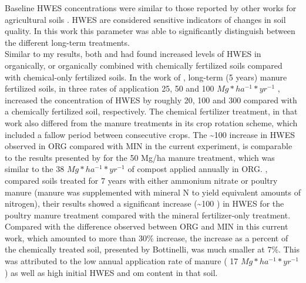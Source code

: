 	Baseline HWES concentrations were similar to those reported by other works for agricultural soils \citep{haynes2005, yousefi2008, puget1998}. HWES are considered sensitive indicators of changes in soil quality. In this work this parameter was able to significantly distinguish between the different long-term treatments.\\
	Similar to my results, both \citet{yousefi2008} and \citet{bottinelli2017} had found increased levels of HWES in organically, or organically combined with chemically fertilized soils compared with chemical-only fertilized soils.
	In the work of \citet{yousefi2008}, long-term (5 years) manure fertilized soils, in three rates of application  25, 50 and 100 $ Mg * ha^{-1} * yr^{-1}  $ , increased the concentration of HWES by roughly 20, 100 and 300 \genericunit compared with a chemically fertilized soil, respectively. The chemical fertilizer treatment, in that work also differed from the manure treatments in its crop rotation scheme, which included a fallow period between consecutive crops. The \~{}100 \genericunit increase in HWES observed in ORG compared with MIN in the current experiment, is comparable to the results presented by \citeauthor{yousefi2008} for the 50 Mg/ha manure treatment, which was similar to the 38 $ Mg * ha^{-1} * yr^{-1}  $ of compost applied annually in ORG.
	\citet{bottinelli2017}, compared soils treated for 7 years with either ammonium nitrate or poultry manure (manure was supplemented with mineral N to yield equivalent amounts of nitrogen), their results  showed a significant increase (\~{}100 \genericunit) in HWES for the poultry manure treatment compared with the mineral fertilizer-only treatment.
	Compared with the difference observed between ORG and MIN in this current work, which amounted to more than 30\% increase, the increase as a percent of the  chemically treated soil, presented by Bottinelli, was much smaller at 7\%. This was attributed to the low annual application rate of manure ( 17 $ Mg * ha^{-1} * yr^{-1}  $ ) as well as high initial HWES and \gls{om} content in that soil.

